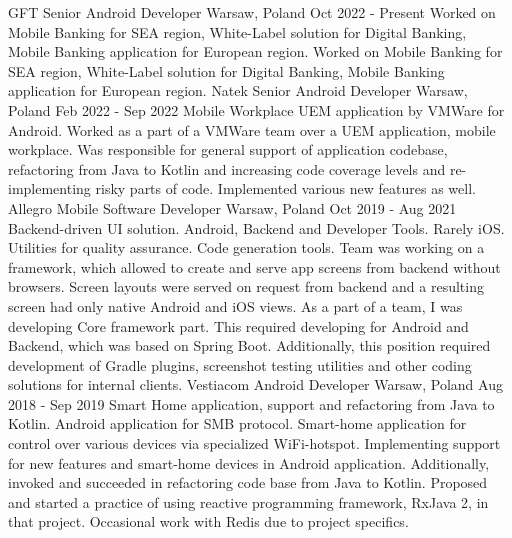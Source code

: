 
\cvexperience
  {GFT}
  {Senior Android Developer}
  {Warsaw, Poland}
  {Oct 2022 - Present}
  {
    Worked on Mobile Banking for SEA region,
    White-Label solution for Digital Banking, 
    \newline
    Mobile Banking application for European region.
  }
  {
    Worked on Mobile Banking for SEA region,
    White-Label solution for Digital Banking, 
    \newline
    Mobile Banking application for European region.
  }
\cvexperience
  {Natek}
  {Senior Android Developer}
  {Warsaw, Poland}
  {Feb 2022 - Sep 2022}
  {
    Mobile Workplace UEM application by VMWare for Android.
  }
  {
    Worked as a part of a VMWare team over a UEM application, mobile workplace. 
    \newline
    Was responsible for general support of application codebase, refactoring from Java to Kotlin and
    increasing code coverage levels and re-implementing risky parts of code.
    Implemented various new features as well.
  }
\cvexperience
  {Allegro}
  {Mobile Software Developer}
  {Warsaw, Poland}
  {Oct 2019 - Aug 2021}
  {
    Backend-driven UI solution. Android, Backend and Developer Tools. Rarely iOS.
    \newline
    Utilities for quality assurance. Code generation tools.
  }
  {
    Team was working on a framework, which allowed to create and serve app screens from backend without browsers.
    \newline
    Screen layouts were served on request from backend and a resulting screen had only native Android and iOS views.
    \newline
    As a part of a team, I was developing Core framework part.
    This required developing for Android and Backend, which was based on Spring Boot.
    Additionally, this position required development of Gradle plugins, screenshot testing utilities and
    other coding solutions for internal clients.
  }
\cvexperience
  {Vestiacom}
  {Android Developer}
  {Warsaw, Poland}
  {Aug 2018 - Sep 2019}
  {
    Smart Home application, support and refactoring from Java to Kotlin.
    \newline
    Android application for SMB protocol.
  }
  {
    Smart-home application for control over various devices via specialized WiFi-hotspot.
    Implementing support for new features and smart-home devices in Android application.
    Additionally, invoked and succeeded in refactoring code base from Java to Kotlin.
    \newline
    Proposed and started a practice of using reactive programming framework, RxJava 2, in that project.
    Occasional work with Redis due to project specifics.
  }
